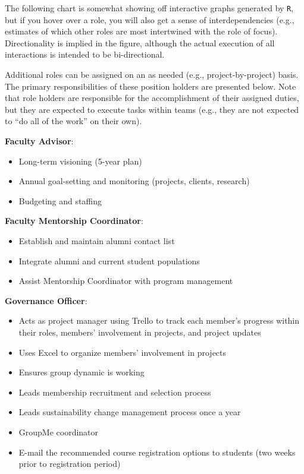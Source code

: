 \documentclass[
]{book}
\providecommand{\tightlist}{%
  \setlength{\itemsep}{0pt}\setlength{\parskip}{0pt}}
\begin{document}
The following chart is somewhat showing off interactive graphs generated by \texttt{R}, but if you hover over a role, you will also get a sense of interdependencies (e.g., estimates of which other roles are most intertwined with the role of focus). Directionality is implied in the figure, although the actual execution of all interactions is intended to be bi-directional.

\hypertarget{htmlwidget-0da5694b088951562b76}{}

Additional roles can be assigned on an as needed (e.g., project-by-project) basis. The primary responsibilities of these position holders are presented below. Note that role holders are responsible for the accomplishment of their assigned duties, but they are expected to execute tasks within teams (e.g., they are not expected to ``do all of the work'' on their own).

\textbf{Faculty Advisor}:

\begin{itemize}
\tightlist
\item
  Long-term visioning (5-year plan)
\item
  Annual goal-setting and monitoring (projects, clients, research)
\item
  Budgeting and staffing
\end{itemize}

\textbf{Faculty Mentorship Coordinator}:

\begin{itemize}
\tightlist
\item
  Establish and maintain alumni contact list\\
\item
  Integrate alumni and current student populations\\
\item
  Assist Mentorship Coordinator with program management
\end{itemize}

\textbf{Governance Officer}:

\begin{itemize}
\tightlist
\item
  Acts as project manager using Trello to track each member's progress within their roles, members' involvement in projects, and project updates
\item
  Uses Excel to organize members' involvement in projects
\item
  Ensures group dynamic is working
\item
  Leads membership recruitment and selection process\\
\item
  Leads sustainability change management process once a year
\item
  GroupMe coordinator
\item
  E-mail the recommended course registration options to students (two weeks prior to registration period)
\end{itemize}
\end{document}
